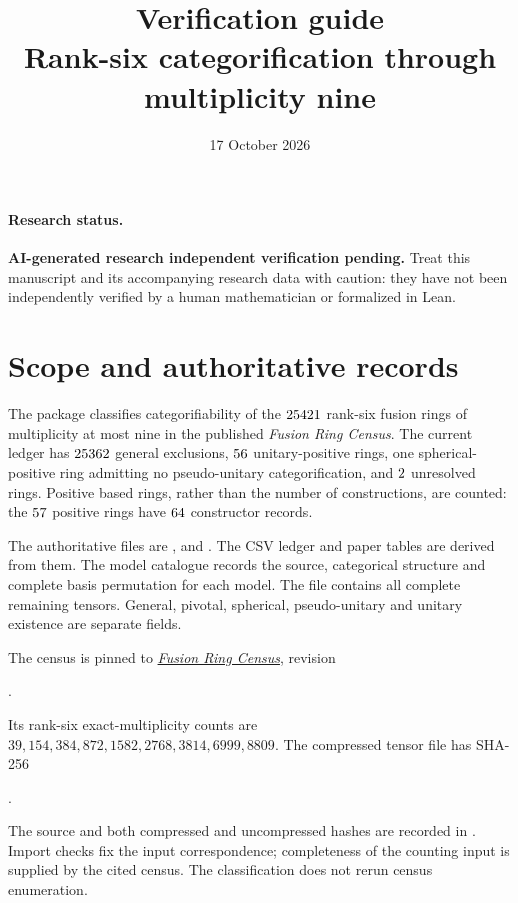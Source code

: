 \documentclass[11pt]{article}
\title{Verification guide\\\large Rank-six categorification through multiplicity nine}
\author{}\date{17 October 2026}
\begin{document}
\maketitle
\paragraph{Research status.} \textbf{AI-generated research \textperiodcentered{} independent verification pending.} Treat this manuscript and its accompanying research data with caution: they have not been independently verified by a human mathematician or formalized in Lean.

\section{Scope and authoritative records}
The package classifies categorifiability of the $25421$ rank-six
fusion rings of multiplicity at most nine in the published
\emph{Fusion Ring Census}. The current ledger has $25362$
general exclusions, $56$ unitary-positive rings, one
spherical-positive ring admitting no pseudo-unitary categorification,
and $2$ unresolved rings. Positive based rings, rather
than the number of constructions, are counted: the $57$
positive rings have $64$ constructor records.

The authoritative files are ,
 and
. The CSV ledger and paper
tables are derived from them. The model catalogue records the source,
categorical structure and complete basis permutation for each model.
The file  contains all
complete remaining tensors. General, pivotal, spherical,
pseudo-unitary and unitary existence are separate fields.

The census is pinned to
\href{https://github.com/sebastienpalcoux/fusion-ring-census}{\emph{Fusion Ring Census}},
revision
\begin{center}\small{}.\end{center}
Its rank-six exact-multiplicity counts are
$39,154,384,872,1582,2768,3814,6999,8809$.
The compressed tensor file  has
SHA-256
\begin{center}\small
{}.
\end{center}
The source and both compressed and uncompressed hashes are recorded in
. Import checks fix the
input correspondence; completeness of the counting input is supplied
by the cited census. The classification does not rerun census enumeration.
\end{document}
